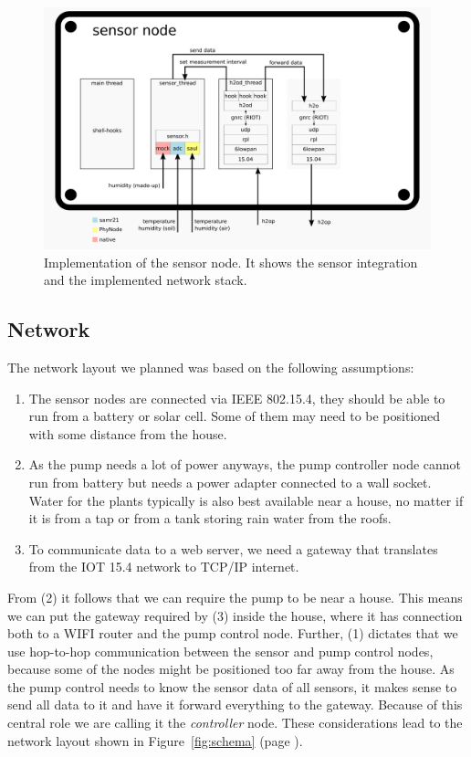 \documentclass[11pt,paper=a4,parskip=half]{scrartcl}
\begin{document}
  \begin{figure}[h]
    \centering
    \includegraphics[width=\textwidth]{stack-sensor}
	  \caption{Implementation of the sensor node. It shows the sensor
	  integration and the implemented network stack.}
    \label{fig:stack_sensor}
  \end{figure}


\subsection{Network}
The network layout we planned was based on the following assumptions:
\begin{enumerate}
  \item The sensor nodes are connected via IEEE 802.15.4, they should be able to run
	from a battery or solar cell. Some of them may need to be positioned
	with some distance from the house.
  \item As the pump needs a lot of power anyways, the pump controller node
	cannot run from battery but needs a power adapter connected to a wall
	socket. Water for the plants typically is also best available
	near a house, no matter if it is from a tap or from a tank
	storing rain water from the roofs.
  \item To communicate data to a web server, we need a gateway that translates
	from the IOT 15.4 network to TCP/IP internet.
\end{enumerate}

From (2) it follows that we can require the pump to be near a house. This means
we can put the gateway required by (3) inside the house, where it has
connection both to a WIFI router and the pump control node. Further, (1)
dictates that we use hop-to-hop communication between the sensor and pump
control nodes, because some of the nodes might be positioned too far away from
the house. As the pump control needs to know the sensor data of all sensors, it
makes sense to send all data to it and have it forward everything to the
gateway. Because of this central role we are calling it the \emph{controller}
node. These considerations lead to the network layout shown in
Figure~\ref{fig:schema} (page \pageref{fig:schema}).
\end{document}
